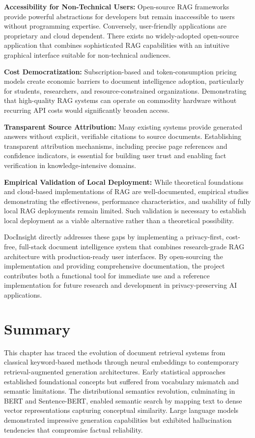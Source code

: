 \textbf{Accessibility for Non-Technical Users:} Open-source RAG frameworks provide powerful abstractions for developers but remain inaccessible to users without programming expertise. Conversely, user-friendly applications are proprietary and cloud dependent. There exists no widely-adopted open-source application that combines sophisticated RAG capabilities with an intuitive graphical interface suitable for non-technical audiences.

\textbf{Cost Democratization:} Subscription-based and token-consumption pricing models create economic barriers to document intelligence adoption, particularly for students, researchers, and resource-constrained organizations. Demonstrating that high-quality RAG systems can operate on commodity hardware without recurring API costs would significantly broaden access.

\textbf{Transparent Source Attribution:} Many existing systems provide generated answers without explicit, verifiable citations to source documents. Establishing transparent attribution mechanisms, including precise page references and confidence indicators, is essential for building user trust and enabling fact verification in knowledge-intensive domains.

\textbf{Empirical Validation of Local Deployment:} While theoretical foundations and cloud-based implementations of RAG are well-documented, empirical studies demonstrating the effectiveness, performance characteristics, and usability of fully local RAG deployments remain limited. Such validation is necessary to establish local deployment as a viable alternative rather than a theoretical possibility.

DocInsight directly addresses these gaps by implementing a privacy-first, cost-free, full-stack document intelligence system that combines research-grade RAG architecture with production-ready user interfaces. By open-sourcing the implementation and providing comprehensive documentation, the project contributes both a functional tool for immediate use and a reference implementation for future research and development in privacy-preserving AI applications.

\section{Summary}

This chapter has traced the evolution of document retrieval systems from classical keyword-based methods through neural embeddings to contemporary retrieval-augmented generation architectures. Early statistical approaches established foundational concepts but suffered from vocabulary mismatch and semantic limitations. The distributional semantics revolution, culminating in BERT and Sentence-BERT, enabled semantic search by mapping text to dense vector representations capturing conceptual similarity. Large language models demonstrated impressive generation capabilities but exhibited hallucination tendencies that compromise factual reliability.

